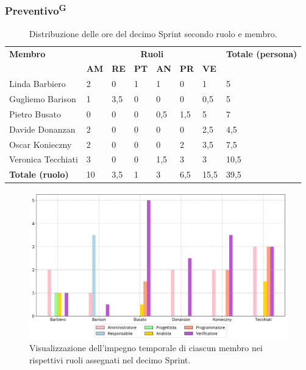 \documentclass[8pt]{article}
\newcommand{\glossterm}[1]{#1\textsuperscript{G}} %
\begin{document}
\subsubsection{\glossterm{Preventivo}}\begin{table}[ht!]
	\centering
	\begin{tabular}{p{4cm} p{1cm} p{1cm} p{1cm} p{1cm} p{1cm} p{1cm} p{3cm}}
		\toprule
        \textbf{Membro} & \multicolumn{6}{c}{\textbf{Ruoli}} & \textbf{Totale (persona)}\\
		& \textbf{AM} & \textbf{RE} & \textbf{PT} & \textbf{AN} & \textbf{PR} & \textbf{VE}\\
		\midrule
        Linda Barbiero & 2 & 0 & 1 & 1 & 0 & 1 & 5 \\ 
        Gugliemo Barison & 1 & 3,5 & 0 & 0 & 0 & 0,5 & 5 \\ 
        Pietro Busato & 0 & 0 & 0 & 0,5 & 1,5 & 5 & 7 \\ 
        Davide Donanzan & 2 & 0 & 0 & 0 & 0 & 2,5 & 4,5 \\ 
        Oscar Konieczny & 2 & 0 & 0 & 0 & 2 & 3,5 & 7,5 \\ 
        Veronica Tecchiati & 3 & 0 & 0 & 1,5 & 3 & 3 & 10,5 \\
        \midrule
        \textbf{Totale (ruolo)} & 10 & 3,5 & 1 & 3 & 6,5 & 15,5 & 39,5 \\ 
	\bottomrule
	\end{tabular}
	\caption{Distribuzione delle ore del decimo Sprint secondo ruolo e membro.}
	\label{table:Distribuzione delle ore del decimo Sprint secondo ruolo e membro}
\end{table}
\begin{figure}[ht!]
    \centering
    \includegraphics[width=15cm]{./images_pdp/istogramma_periodo_10.png}
    \caption{Visualizzazione dell'impegno temporale di ciascun membro nei rispettivi ruoli assegnati
    nel decimo Sprint.}
    \label{figure:Visualizzazione dell'impegno temporale di ciascun membro nei rispettivi ruoli
    assegnati nel decimo Sprint}
\end{figure}
\end{document}
